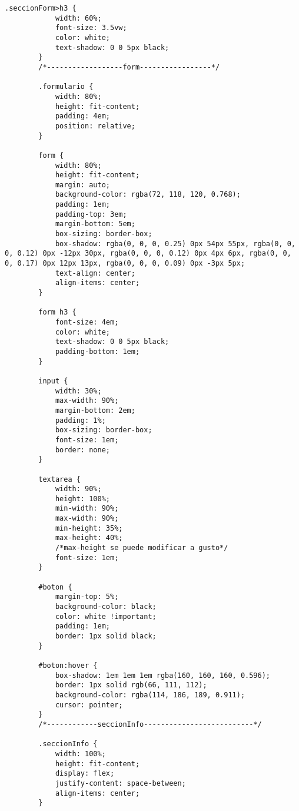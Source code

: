 \begin{lstlisting}[caption=location.css (LMSI)]
        .seccionForm>h3 {
            width: 60%;
            font-size: 3.5vw;
            color: white;
            text-shadow: 0 0 5px black;
        }
        /*------------------form-----------------*/

        .formulario {
            width: 80%;
            height: fit-content;
            padding: 4em;
            position: relative;
        }

        form {
            width: 80%;
            height: fit-content;
            margin: auto;
            background-color: rgba(72, 118, 120, 0.768);
            padding: 1em;
            padding-top: 3em;
            margin-bottom: 5em;
            box-sizing: border-box;
            box-shadow: rgba(0, 0, 0, 0.25) 0px 54px 55px, rgba(0, 0, 0, 0.12) 0px -12px 30px, rgba(0, 0, 0, 0.12) 0px 4px 6px, rgba(0, 0, 0, 0.17) 0px 12px 13px, rgba(0, 0, 0, 0.09) 0px -3px 5px;
            text-align: center;
            align-items: center;
        }

        form h3 {
            font-size: 4em;
            color: white;
            text-shadow: 0 0 5px black;
            padding-bottom: 1em;
        }

        input {
            width: 30%;
            max-width: 90%;
            margin-bottom: 2em;
            padding: 1%;
            box-sizing: border-box;
            font-size: 1em;
            border: none;
        }

        textarea {
            width: 90%;
            height: 100%;
            min-width: 90%;
            max-width: 90%;
            min-height: 35%;
            max-height: 40%;
            /*max-height se puede modificar a gusto*/
            font-size: 1em;
        }

        #boton {
            margin-top: 5%;
            background-color: black;
            color: white !important;
            padding: 1em;
            border: 1px solid black;
        }

        #boton:hover {
            box-shadow: 1em 1em 1em rgba(160, 160, 160, 0.596);
            border: 1px solid rgb(66, 111, 112);
            background-color: rgba(114, 186, 189, 0.911);
            cursor: pointer;
        }
        /*------------seccionInfo--------------------------*/

        .seccionInfo {
            width: 100%;
            height: fit-content;
            display: flex;
            justify-content: space-between;
            align-items: center;
        }


\end{lstlisting}
